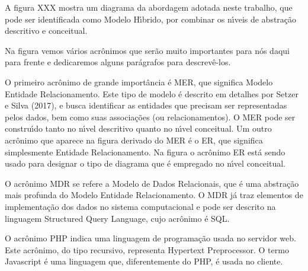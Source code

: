 \documentclass[
12pt,		%
openright,	%
twoside,  %
a4paper,			%
chapter=TITLE,		%
english,			%
french,				%
spanish,			%
brazil				%
]{USPSC-classe/USPSC}
\begin{document}
A figura XXX mostra um diagrama da abordagem adotada neste trabalho, que pode ser identificada como \textquotedbl Modelo H\'{\i}brido\textquotedbl , por combinar os n\'{\i}veis de abstra\c{c}\~ao descritivo e conceitual.




Na figura vemos v\'arios acr\^onimos que ser\~ao muito importantes para n\'os daqui para frente e dedicaremos alguns par\'agrafos para descrev\^e-los.




O primeiro acr\^onimo de grande import\^ancia \'e MER, que significa Modelo Entidade Relacionamento. Este tipo de modelo \'e descrito em detalhes por Setzer e Silva (2017), e busca identificar as entidades que precisam ser representadas pelos dados, bem como suas associa\c{c}\~oes (ou relacionamentos). O MER pode ser constru\'{\i}do tanto no n\'{\i}vel descritivo quanto no n\'{\i}vel conceitual. Um outro acr\^onimo que aparece na figura derivado do MER \'e o ER, que significa simplesmente \textquotedbl Entidade Relacionamento\textquotedbl . Na figura o acr\^onimo ER est\'a sendo usado para designar o tipo de diagrama que \'e empregado no n\'{\i}vel conceitual.




O acr\^onimo MDR se refere a Modelo de Dados Relacionais, que \'e uma abstra\c{c}\~ao mais profunda do Modelo Entidade Relacionamento. O MDR j\'a traz elementos de implementa\c{c}\~ao dos dados no sistema computacional e pode ser descrito na linguagem Structured Query Language, cujo acr\^onimo \'e SQL.




O acr\^onimo PHP indica uma linguagem de programa\c{c}\~ao usada no servidor web. Este acr\^onimo, do tipo recursivo, representa Hypertext Preprocessor. O termo Javascript \'e uma linguagem que, diferentemente do PHP, \'e usada no cliente.
\end{document}
